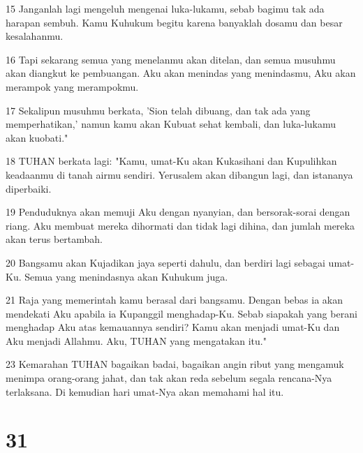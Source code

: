 \par 15 Janganlah lagi mengeluh mengenai luka-lukamu, sebab bagimu tak ada harapan sembuh. Kamu Kuhukum begitu karena banyaklah dosamu dan besar kesalahanmu.
\par 16 Tapi sekarang semua yang menelanmu akan ditelan, dan semua musuhmu akan diangkut ke pembuangan. Aku akan menindas yang menindasmu, Aku akan merampok yang merampokmu.
\par 17 Sekalipun musuhmu berkata, 'Sion telah dibuang, dan tak ada yang memperhatikan,' namun kamu akan Kubuat sehat kembali, dan luka-lukamu akan kuobati."
\par 18 TUHAN berkata lagi: "Kamu, umat-Ku akan Kukasihani dan Kupulihkan keadaanmu di tanah airmu sendiri. Yerusalem akan dibangun lagi, dan istananya diperbaiki.
\par 19 Penduduknya akan memuji Aku dengan nyanyian, dan bersorak-sorai dengan riang. Aku membuat mereka dihormati dan tidak lagi dihina, dan jumlah mereka akan terus bertambah.
\par 20 Bangsamu akan Kujadikan jaya seperti dahulu, dan berdiri lagi sebagai umat-Ku. Semua yang menindasnya akan Kuhukum juga.
\par 21 Raja yang memerintah kamu berasal dari bangsamu. Dengan bebas ia akan mendekati Aku apabila ia Kupanggil menghadap-Ku. Sebab siapakah yang berani menghadap Aku atas kemauannya sendiri? Kamu akan menjadi umat-Ku dan Aku menjadi Allahmu. Aku, TUHAN yang mengatakan itu."
\par 23 Kemarahan TUHAN bagaikan badai, bagaikan angin ribut yang mengamuk menimpa orang-orang jahat, dan tak akan reda sebelum segala rencana-Nya terlaksana. Di kemudian hari umat-Nya akan memahami hal itu.

\chapter{31}

